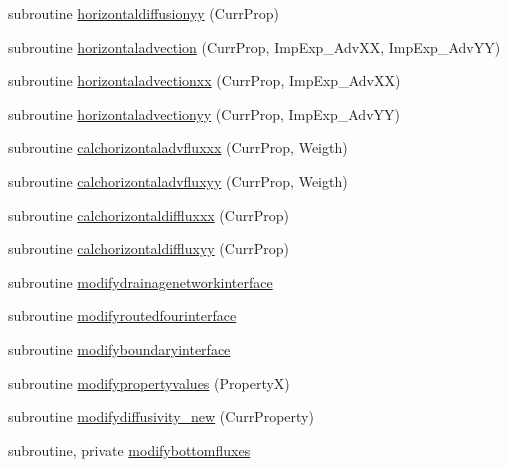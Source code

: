 \begin{DoxyCompactItemize}
\item 
subroutine \mbox{\hyperlink{namespacemodulerunoffproperties_a4725654ec67f2fac23c7df49fb984a0e}{horizontaldiffusionyy}} (Curr\+Prop)
\item 
subroutine \mbox{\hyperlink{namespacemodulerunoffproperties_a88919c7edf33d9d985c9378f1d5a24f9}{horizontaladvection}} (Curr\+Prop, Imp\+Exp\+\_\+\+Adv\+XX, Imp\+Exp\+\_\+\+Adv\+YY)
\item 
subroutine \mbox{\hyperlink{namespacemodulerunoffproperties_add33ed1dc6829db881e5d276d5354ef8}{horizontaladvectionxx}} (Curr\+Prop, Imp\+Exp\+\_\+\+Adv\+XX)
\item 
subroutine \mbox{\hyperlink{namespacemodulerunoffproperties_a23a3ece2ec9c5af37ce26d5c50ba1c03}{horizontaladvectionyy}} (Curr\+Prop, Imp\+Exp\+\_\+\+Adv\+YY)
\item 
subroutine \mbox{\hyperlink{namespacemodulerunoffproperties_a23224aa9dab3db29383ab466a5695a17}{calchorizontaladvfluxxx}} (Curr\+Prop, Weigth)
\item 
subroutine \mbox{\hyperlink{namespacemodulerunoffproperties_a9d3bb361bae08dcb2b84d831a49712be}{calchorizontaladvfluxyy}} (Curr\+Prop, Weigth)
\item 
subroutine \mbox{\hyperlink{namespacemodulerunoffproperties_a296ba41d998d7fe4223d8d224ba9c0ba}{calchorizontaldiffluxxx}} (Curr\+Prop)
\item 
subroutine \mbox{\hyperlink{namespacemodulerunoffproperties_af55b2182548c087b1f254c0a7fe61904}{calchorizontaldiffluxyy}} (Curr\+Prop)
\item 
subroutine \mbox{\hyperlink{namespacemodulerunoffproperties_af923d884ffbf9570877d94db798722ef}{modifydrainagenetworkinterface}}
\item 
subroutine \mbox{\hyperlink{namespacemodulerunoffproperties_ac6419261cb4a595997e6f2b480bd1b27}{modifyroutedfourinterface}}
\item 
subroutine \mbox{\hyperlink{namespacemodulerunoffproperties_abb21b8b2577c08fe41a7a41e186272d5}{modifyboundaryinterface}}
\item 
subroutine \mbox{\hyperlink{namespacemodulerunoffproperties_ad0713aee47ec52341e436c46ac2a4fd6}{modifypropertyvalues}} (PropertyX)
\item 
subroutine \mbox{\hyperlink{namespacemodulerunoffproperties_abb384a4ec2ef0d9cc812459889ee8063}{modifydiffusivity\+\_\+new}} (Curr\+Property)
\item 
subroutine, private \mbox{\hyperlink{namespacemodulerunoffproperties_a2c67e89cd73897e22e4941c034891418}{modifybottomfluxes}}

\end{DoxyCompactItemize}

